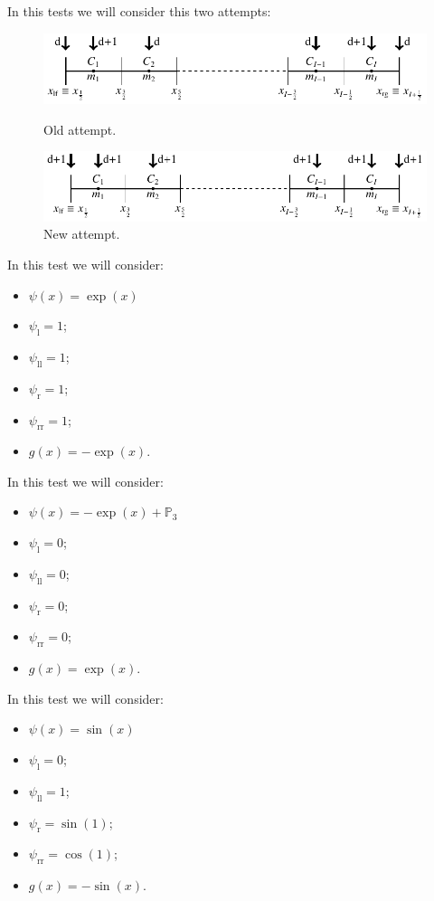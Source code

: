 \documentclass[12pt,a4paper]{article}
\author{Hélder Cruz}
\newcommand{\psil}{\psi_\text{l}}
\newcommand{\psill}{\psi_{\text{ll}}}
\newcommand{\psir}{\psi_\text{r}}
\newcommand{\psirr}{\psi_{\text{rr}}}
\begin{document}
In this tests we will consider this two attempts:
\begin{figure}[h]
\centering
\includegraphics[width=\textwidth]{images/mesh_scheme_d_plus_1_old/mesh_scheme_d_plus_1_old}
\caption{Old attempt.}
\includegraphics[width=\textwidth]{images/mesh_scheme_d_plus_1_new/mesh_scheme_d_plus_1_new}
\caption{New attempt.}
\end{figure}
\vspace{-0.5cm}
In this test we will consider:
\begin{itemize}
\item $\psi(x)=\exp(x)$
\item $\psil=1$;
\item $\psill=1$;
\item $\psir=1$;
\item $\psirr=1$;
\item $g(x)=-\exp(x)$.
\end{itemize}


\pagebreak
In this test we will consider:
\begin{itemize}
\item $\psi(x)=-\exp(x)+\mathbb{P}_3$
\item $\psil=0$;
\item $\psill=0$;
\item $\psir=0$;
\item $\psirr=0$;
\item $g(x)=\exp(x)$.
\end{itemize}

\pagebreak
In this test we will consider:
\begin{itemize}
\item $\psi(x)=\sin(x)$
\item $\psil=0$;
\item $\psill=1$;
\item $\psir=\sin(1)$;
\item $\psirr=\cos(1)$;
\item $g(x)=-\sin(x)$.
\end{itemize}
\end{document}
